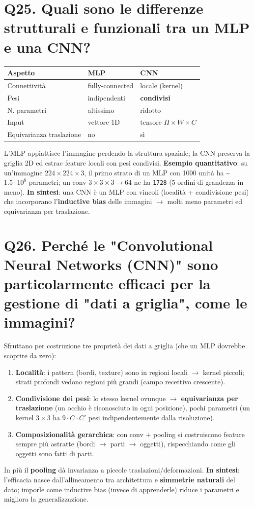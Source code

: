 \documentclass[11pt,a4paper]{article}
\begin{document}
\section*{Q25. Quali sono le differenze strutturali e funzionali tra un MLP e una CNN?}
\begin{center}\renewcommand{\arraystretch}{1.25}
\begin{tabular}{|l|l|l|}\hline
\textbf{Aspetto} & \textbf{MLP} & \textbf{CNN} \\ \hline
Connettività & fully-connected & locale (kernel) \\ \hline
Pesi & indipendenti & \textbf{condivisi} \\ \hline
N. parametri & altissimo & ridotto \\ \hline
Input & vettore 1D & tensore $H\times W\times C$ \\ \hline
Equivarianza traslazione & no & sì \\ \hline
\end{tabular}\end{center}
L'MLP appiattisce l'immagine perdendo la struttura spaziale; la CNN preserva la griglia 2D ed estrae feature locali con pesi condivisi.
\textbf{Esempio quantitativo}: su un'immagine $224\times 224\times 3$, il primo strato di un MLP con 1000 unità ha \textasciitilde{}$1.5\cdot 10^{8}$ parametri; un conv $3\times 3\times 3 \to  64$ ne ha \texttt{1728} (5 ordini di grandezza in meno).
\textbf{In sintesi}: una CNN è un MLP con vincoli (località + condivisione pesi) che incorporano l'\textbf{inductive bias} delle immagini $\to $ molti meno parametri ed equivarianza per traslazione.
\newpage
\section*{Q26. Perché le "Convolutional Neural Networks (CNN)" sono particolarmente efficaci per la gestione di "dati a griglia", come le immagini?}
Sfruttano per costruzione tre proprietà dei dati a griglia (che un MLP dovrebbe scoprire da zero):
\begin{enumerate}
\item \textbf{Località}: i pattern (bordi, texture) sono in regioni locali $\to $ kernel piccoli; strati profondi vedono regioni più grandi (campo recettivo crescente).
\item \textbf{Condivisione dei pesi}: lo stesso kernel ovunque $\to $ \textbf{equivarianza per traslazione} (un occhio è riconosciuto in ogni posizione), pochi parametri (un kernel $3\times 3$ ha $9\cdot C\cdot C'$ pesi indipendentemente dalla risoluzione).
\item \textbf{Composizionalità gerarchica}: con conv + pooling si costruiscono feature sempre più astratte (bordi $\to $ parti $\to $ oggetti), rispecchiando come gli oggetti sono fatti di parti.
\end{enumerate}
In più il \textbf{pooling} dà invarianza a piccole traslazioni/deformazioni.
\textbf{In sintesi}: l'efficacia nasce dall'allineamento tra architettura e \textbf{simmetrie naturali} del dato; imporle come inductive bias (invece di apprenderle) riduce i parametri e migliora la generalizzazione.
\newpage
\end{document}
